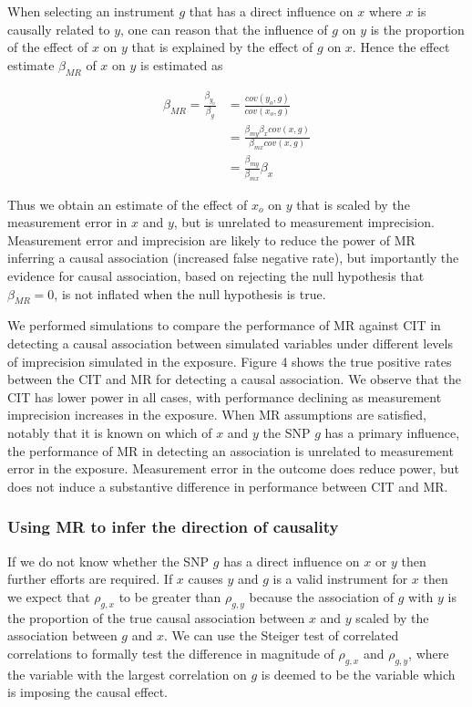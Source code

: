 \documentclass[]{article}
\begin{document}
When selecting an instrument \(g\) that has a direct influence on \(x\)
where \(x\) is causally related to \(y\), one can reason that the
influence of \(g\) on \(y\) is the proportion of the effect of \(x\) on
\(y\) that is explained by the effect of \(g\) on \(x\). Hence the
effect estimate \(\beta_{MR}\) of \(x\) on \(y\) is estimated as

\[
\begin{aligned}
\beta_{MR} = \frac{\beta_{y_o}}{\beta_g} & = \frac{cov(y_o, g)}{cov(x_o, g)} \\
                                         & = \frac{\beta_{my} \beta_x cov(x, g)} {\beta_{mx} cov(x, g)} \\
                                         & = \frac{\beta_{my}} {\beta_{mx}} \beta_x
\end{aligned}
\]

Thus we obtain an estimate of the effect of \(x_o\) on \(y\) that is
scaled by the measurement error in \(x\) and \(y\), but is unrelated to
measurement imprecision. Measurement error and imprecision are likely to
reduce the power of MR inferring a causal association (increased false
negative rate), but importantly the evidence for causal association,
based on rejecting the null hypothesis that \(\beta_{MR} = 0\), is not
inflated when the null hypothesis is true.

We performed simulations to compare the performance of MR against CIT in
detecting a causal association between simulated variables under
different levels of imprecision simulated in the exposure. Figure 4
shows the true positive rates between the CIT and MR for detecting a
causal association. We observe that the CIT has lower power in all
cases, with performance declining as measurement imprecision increases
in the exposure. When MR assumptions are satisfied, notably that it is
known on which of \(x\) and \(y\) the SNP \(g\) has a primary influence,
the performance of MR in detecting an association is unrelated to
measurement error in the exposure. Measurement error in the outcome does
reduce power, but does not induce a substantive difference in
performance between CIT and MR.

\subsubsection{Using MR to infer the direction of
causality}\label{using-mr-to-infer-the-direction-of-causality}

If we do not know whether the SNP \(g\) has a direct influence on \(x\)
or \(y\) then further efforts are required. If \(x\) causes \(y\) and
\(g\) is a valid instrument for \(x\) then we expect that \(\rho_{g,x}\)
to be greater than \(\rho_{g,y}\) because the association of \(g\) with
\(y\) is the proportion of the true causal association between \(x\) and
\(y\) scaled by the association between \(g\) and \(x\). We can use the
Steiger test of correlated correlations to formally test the difference
in magnitude of \(\rho_{g,x}\) and \(\rho_{g,y}\), where the variable
with the largest correlation on \(g\) is deemed to be the variable which
is imposing the causal effect.
\end{document}
